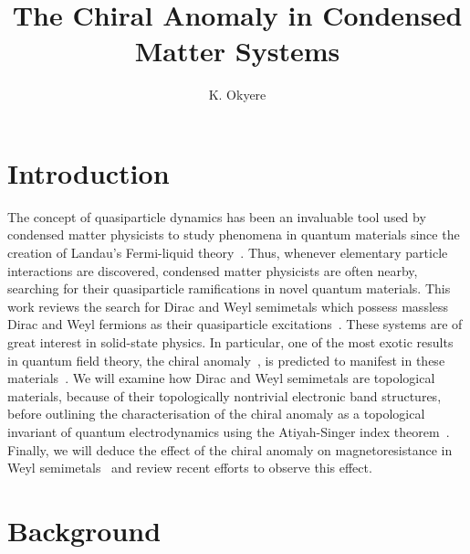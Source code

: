 \documentclass[11pt, a4paper]{article}
\begin{document}
\title{The Chiral Anomaly in Condensed Matter Systems}
\author{K. Okyere}


\maketitle



\section{Introduction}

The concept of quasiparticle dynamics has been an invaluable tool used by
condensed matter physicists to study phenomena in quantum materials
since the creation of Landau's Fermi-liquid theory~\cite{Landau:1956}. Thus, whenever
elementary particle interactions are discovered, condensed matter
physicists are often nearby, searching for their quasiparticle
ramifications in novel quantum materials. This work reviews the search
for Dirac and Weyl semimetals which possess massless Dirac and Weyl fermions
as their quasiparticle excitations~\cite{WSMreview}.
These systems are of great interest in solid-state physics.
In particular, one of the most exotic results in
quantum field theory, the chiral anomaly~\cite{Adler,Bell-Jackiw}, is predicted to manifest in
these materials~\cite{SonSpivak}. We will examine how Dirac and Weyl semimetals are topological
materials, because of their topologically nontrivial electronic band structures,
before outlining the characterisation of the chiral anomaly as a
topological invariant of quantum electrodynamics using the Atiyah-Singer index
theorem~\cite{Atiyah-Singer}. Finally, we will deduce
the effect of the chiral anomaly on magnetoresistance in Weyl semimetals~\cite{SonSpivak}
and review recent efforts to observe this effect.
\section{Background}
\end{document}
